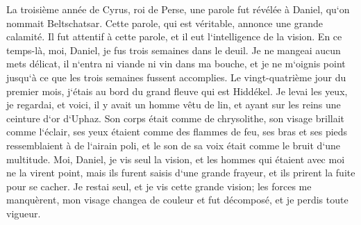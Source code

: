 \verse La troisième année de Cyrus, roi de Perse, une parole fut révélée à Daniel, qu`on nommait Beltschatsar. Cette parole, qui est véritable, annonce une grande calamité. Il fut attentif à cette parole, et il eut l`intelligence de la vision. 
\verse En ce temps-là, moi, Daniel, je fus trois semaines dans le deuil. 
\verse Je ne mangeai aucun mets délicat, il n`entra ni viande ni vin dans ma bouche, et je ne m`oignis point jusqu`à ce que les trois semaines fussent accomplies. 
\verse Le vingt-quatrième jour du premier mois, j`étais au bord du grand fleuve qui est Hiddékel. 
\verse Je levai les yeux, je regardai, et voici, il y avait un homme vêtu de lin, et ayant sur les reins une ceinture d`or d`Uphaz. 
\verse Son corps était comme de chrysolithe, son visage brillait comme l`éclair, ses yeux étaient comme des flammes de feu, ses bras et ses pieds ressemblaient à de l`airain poli, et le son de sa voix était comme le bruit d`une multitude. 
\verse Moi, Daniel, je vis seul la vision, et les hommes qui étaient avec moi ne la virent point, mais ils furent saisis d`une grande frayeur, et ils prirent la fuite pour se cacher. 
\verse Je restai seul, et je vis cette grande vision; les forces me manquèrent, mon visage changea de couleur et fut décomposé, et je perdis toute vigueur. 
